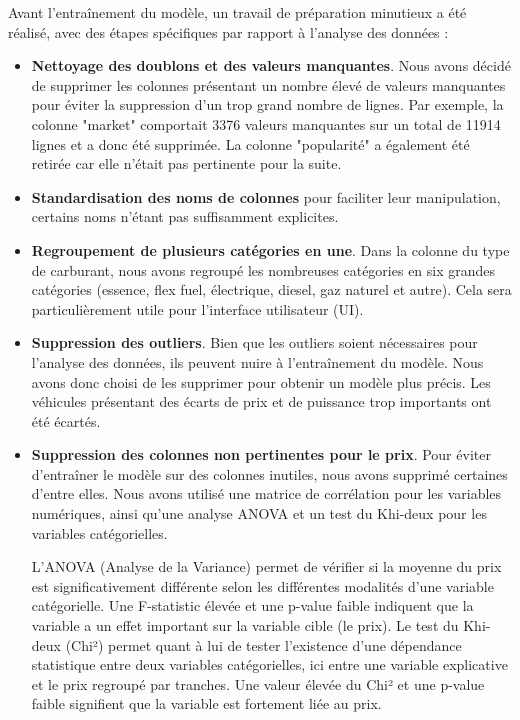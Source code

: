 \documentclass[12pt]{report}
\begin{document}
Avant l'entraînement du modèle, un travail de préparation minutieux a été réalisé, avec des étapes spécifiques par rapport à l'analyse des données :
\begin{itemize}
    \item \textbf{Nettoyage des doublons et des valeurs manquantes}. Nous avons décidé de supprimer les colonnes présentant un nombre élevé de valeurs manquantes pour éviter la suppression d'un trop grand nombre de lignes. Par exemple, la colonne "market" comportait 3376 valeurs manquantes sur un total de 11914 lignes et a donc été supprimée. La colonne "popularité" a également été retirée car elle n'était pas pertinente pour la suite.
    \item \textbf{Standardisation des noms de colonnes} pour faciliter leur manipulation, certains noms n'étant pas suffisamment explicites.
    \item \textbf{Regroupement de plusieurs catégories en une}. Dans la colonne du type de carburant, nous avons regroupé les nombreuses catégories en six grandes catégories (essence, flex fuel, électrique, diesel, gaz naturel et autre). Cela sera particulièrement utile pour l'interface utilisateur (UI).
    \item \textbf{Suppression des outliers}. Bien que les outliers soient nécessaires pour l'analyse des données, ils peuvent nuire à l'entraînement du modèle. Nous avons donc choisi de les supprimer pour obtenir un modèle plus précis. Les véhicules présentant des écarts de prix et de puissance trop importants ont été écartés.
    \item \textbf{Suppression des colonnes non pertinentes pour le prix}. Pour éviter d'entraîner le modèle sur des colonnes inutiles, nous avons supprimé certaines d'entre elles. Nous avons utilisé une matrice de corrélation pour les variables numériques, ainsi qu'une analyse ANOVA et un test du Khi-deux pour les variables catégorielles. 
    
    L'ANOVA (Analyse de la Variance) permet de vérifier si la moyenne du prix est significativement différente selon les différentes modalités d'une variable catégorielle. Une F-statistic élevée et une p-value faible indiquent que la variable a un effet important sur la variable cible (le prix).  
    Le test du Khi-deux (Chi²) permet quant à lui de tester l'existence d'une dépendance statistique entre deux variables catégorielles, ici entre une variable explicative et le prix regroupé par tranches. Une valeur élevée du Chi² et une p-value faible signifient que la variable est fortement liée au prix.


\end{itemize}
\end{document}

